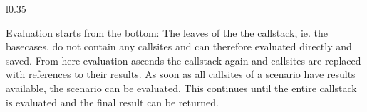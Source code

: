 
\begin{wrapfigure}{l}{0.35\linewidth}
\centering

\caption{}\label{tbl:evaluation}
\end{wrapfigure}

Evaluation starts from the bottom: The leaves of the the callstack, ie. the basecases, do not contain any callsites and can therefore evaluated directly and saved. From here evaluation ascends the callstack again and callsites are replaced with references to their results. As soon as all callsites of a scenario have results available, the scenario can be evaluated. This continues until the entire callstack is evaluated and the final result can be returned.





